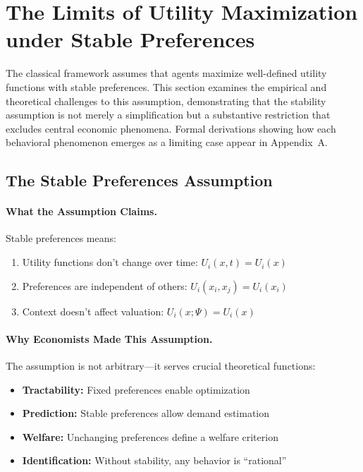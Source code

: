 \section{The Limits of Utility Maximization under Stable Preferences}
\label{sec:limitsutility}

The classical framework assumes that agents maximize well-defined utility functions
with stable preferences. This section examines the empirical and theoretical challenges
to this assumption, demonstrating that the stability assumption is not merely
a simplification but a substantive restriction that excludes central economic phenomena. Formal derivations showing how each behavioral phenomenon emerges as a limiting case appear in Appendix~A.

\subsection{The Stable Preferences Assumption}

\paragraph{What the Assumption Claims.}
Stable preferences means:
\begin{enumerate}
  \item Utility functions don't change over time: $U_i(x, t) = U_i(x)$
  \item Preferences are independent of others: $U_i(x_i, x_j) = U_i(x_i)$
  \item Context doesn't affect valuation: $U_i(x; \Psi) = U_i(x)$
\end{enumerate}

\paragraph{Why Economists Made This Assumption.}
The assumption is not arbitrary---it serves crucial theoretical functions:
\begin{itemize}
  \item \textbf{Tractability:} Fixed preferences enable optimization
  \item \textbf{Prediction:} Stable preferences allow demand estimation
  \item \textbf{Welfare:} Unchanging preferences define a welfare criterion
  \item \textbf{Identification:} Without stability, any behavior is ``rational''
\end{itemize}

